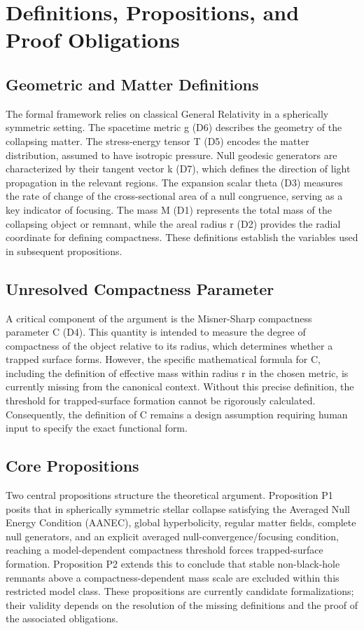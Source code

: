 \documentclass[conference]{IEEEtran}
\begin{document}
\section{Definitions, Propositions, and Proof Obligations}
\subsection{Geometric and Matter Definitions}
The formal framework relies on classical General Relativity in a spherically symmetric setting. The spacetime metric g (D6) describes the geometry of the collapsing matter. The stress-energy tensor T (D5) encodes the matter distribution, assumed to have isotropic pressure. Null geodesic generators are characterized by their tangent vector k (D7), which defines the direction of light propagation in the relevant regions. The expansion scalar theta (D3) measures the rate of change of the cross-sectional area of a null congruence, serving as a key indicator of focusing. The mass M (D1) represents the total mass of the collapsing object or remnant, while the areal radius r (D2) provides the radial coordinate for defining compactness. These definitions establish the variables used in subsequent propositions.

\subsection{Unresolved Compactness Parameter}
A critical component of the argument is the Misner-Sharp compactness parameter C (D4). This quantity is intended to measure the degree of compactness of the object relative to its radius, which determines whether a trapped surface forms. However, the specific mathematical formula for C, including the definition of effective mass within radius r in the chosen metric, is currently missing from the canonical context. Without this precise definition, the threshold for trapped-surface formation cannot be rigorously calculated. Consequently, the definition of C remains a design assumption requiring human input to specify the exact functional form.

\subsection{Core Propositions}
Two central propositions structure the theoretical argument. Proposition P1 posits that in spherically symmetric stellar collapse satisfying the Averaged Null Energy Condition (AANEC), global hyperbolicity, regular matter fields, complete null generators, and an explicit averaged null-convergence/focusing condition, reaching a model-dependent compactness threshold forces trapped-surface formation. Proposition P2 extends this to conclude that stable non-black-hole remnants above a compactness-dependent mass scale are excluded within this restricted model class. These propositions are currently candidate formalizations; their validity depends on the resolution of the missing definitions and the proof of the associated obligations.
\end{document}
